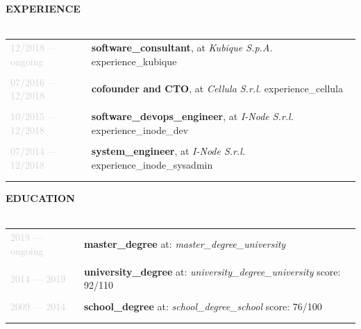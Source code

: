 \documentclass{article}
\begin{document}
\textbf{\textcolor{deepblue}{\uppercase{{{experience}}}}} \\\\ \hfill
\begin{tabular}{ R{3cm} L{12cm} }
	\textcolor{lightgray}{12/2018 — {{ongoing}}} &
		\textbf{{{software_consultant}}}, \MakeLowercase{{{at}}} \textit{Kubique S.p.A.} \linebreak
		{{experience_kubique}} \\\\ \hfill
	\textcolor{lightgray}{07/2016 — 12/2018} &
		\textbf{{{cofounder}} {{and}} CTO}, \MakeLowercase{{{at}}} \textit{Cellula S.r.l.} \linebreak
		{{experience_cellula}} \\\\ \hfill
	\textcolor{lightgray}{10/2015 — 12/2018} &
		\textbf{{{software_devops_engineer}}}, \MakeLowercase{{{at}}} \textit{I-Node S.r.l.} \linebreak
		{{experience_inode_dev}} \\\\ \hfill
	\textcolor{lightgray}{07/2014 — 12/2018} &
		\textbf{{{system_engineer}}}, \MakeLowercase{{{at}}} \textit{I-Node S.r.l.} \linebreak
		{{experience_inode_sysadmin}} \\\\ \hfill
\end{tabular}

\textbf{\textcolor{deepblue}{\uppercase{{{education}}}}} \\\\ \hfill
\begin{tabular}{ R{3cm} L{12cm} }
	\textcolor{lightgray}{2019 — {{ongoing}}} &
		\textbf{{{master_degree}}} \linebreak
		{{at}}: \textit{{{master_degree_university}}} \\\\ \hfill
	\textcolor{lightgray}{2014 — 2019} &
		\textbf{{{university_degree}}} \linebreak
		{{at}}: \textit{{{university_degree_university}}} \linebreak
		{{score}}: 92/110 \\\\ \hfill
	\textcolor{lightgray}{2009 — 2014} &
		\textbf{{{school_degree}}} \linebreak
		{{at}}: \textit{{{school_degree_school}}} \linebreak
		{{score}}: 76/100 \\\\ \hfill
\end{tabular}
\end{document}
